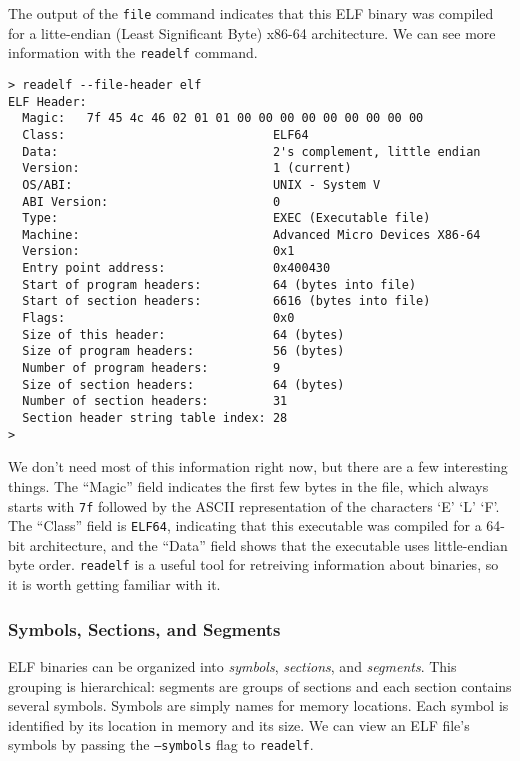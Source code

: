 \documentclass{article}
\begin{document}
The output of the \texttt{file} command indicates that this ELF binary was
compiled for a litte-endian (Least Significant Byte) x86-64 architecture. We can
see more information with the \texttt{readelf} command.

\begin{lstlisting}
> readelf --file-header elf
ELF Header:
  Magic:   7f 45 4c 46 02 01 01 00 00 00 00 00 00 00 00 00 
  Class:                             ELF64
  Data:                              2's complement, little endian
  Version:                           1 (current)
  OS/ABI:                            UNIX - System V
  ABI Version:                       0
  Type:                              EXEC (Executable file)
  Machine:                           Advanced Micro Devices X86-64
  Version:                           0x1
  Entry point address:               0x400430
  Start of program headers:          64 (bytes into file)
  Start of section headers:          6616 (bytes into file)
  Flags:                             0x0
  Size of this header:               64 (bytes)
  Size of program headers:           56 (bytes)
  Number of program headers:         9
  Size of section headers:           64 (bytes)
  Number of section headers:         31
  Section header string table index: 28
> 
\end{lstlisting}

We don't need most of this information right now, but there are a few
interesting things. The ``Magic'' field indicates the first few bytes in the
file, which always starts with \texttt{7f} followed by the ASCII representation
of the characters `E' `L' `F'. The ``Class'' field is \texttt{ELF64}, indicating
that this executable was compiled for a 64-bit architecture, and the ``Data''
field shows that the executable uses little-endian byte order. \texttt{readelf}
is a useful tool for retreiving information about binaries, so it is worth
getting familiar with it.

\subsubsection{Symbols, Sections, and Segments}
ELF binaries can be organized into \emph{symbols}, \emph{sections}, and
\emph{segments}. This grouping is hierarchical: segments are groups of sections
and each section contains several symbols. Symbols are simply names for memory
locations. Each symbol is identified by its location in memory and its size.
We can view an ELF file's symbols by passing the \texttt{--symbols} flag to
\texttt{readelf}.
\end{document}
